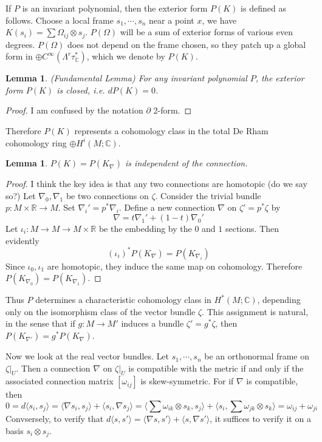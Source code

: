 \documentclass[12pt]{article}
\theoremstyle{plain}
\newtheorem{lemma}[equation]{Lemma}
\theoremstyle{definition}
\newcommand{\IC}{\mathbb{C}}
\newcommand{\IR}{\mathbb{R}}
\newcommand\tensor{{\otimes}}
\newcommand{\<}{\langle}
\renewcommand{\>}{\rangle}
\newcommand{\p}{\partial}
\newcommand{\w}{\omega}
\newcommand{\Ohm}{\Omega}
\begin{document}
If $P$ is an invariant polynomial, then the exterior form $P(K)$ is defined as follows. Choose a local frame $s_1, \cdots, s_n$ near a point $x$, we have $K(s_i) = \sum \Ohm_{ij} \tensor s_j$. $P(\Ohm)$ will be a sum of exterior forms of various even degrees. $P(\Ohm)$ does not depend on the frame chosen, so they patch up a global form in $\oplus C^\infty(\Lambda^r \tau_\IC^*)$, which we denote by $P(K)$. 

\begin{lemma}
\emph{(Fundamental Lemma)} For any invariant polynomial $P$, the exterior form $P(K)$ is closed, i.e. $d P(K) = 0$. 
\end{lemma}
\begin{proof}
I am confused by the notation $\p$ 2-form. 

\end{proof}

Therefore $P(K)$ represents a cohomology class in the total De Rham cohomology ring $\oplus H^i(M; \IC)$.
\begin{lemma} $P(K) = P(K_\nabla)$ is independent of the connection. 
\end{lemma}
\begin{proof}
I think the key idea is that any two connections are homotopic (do we say so?) Let $\nabla_0, \nabla_1$ be two connections on $\zeta$. Consider the trivial bundle $p : M \times \IR \to M$. Set $\nabla_i' = p^* \nabla_i$. Define a new connection $\nabla$ on $\zeta' = p^* \zeta$ by $$\nabla = t \nabla_1' + (1 - t) \nabla_0'$$ Let $ \iota_i : M \to M \to M \times \IR$ be the embedding by the $0$ and $1$ sections. Then evidently 
$$ (\iota_i)^* P(K_\nabla) = P(K_{\nabla_i}) $$
Since $\iota_0, \iota_1$ are homotopic, they induce the same map on cohomology. Therefore $P(K_{\nabla_0}) = P(K_{\nabla_1})$. 
\end{proof} 

Thus $P$ determines a characteristic cohomology class in $H^*(M; \IC)$, depending only on the isomorphism class of the vector bundle $\zeta$. This assignment is natural, in the sense that if $g : M \to M'$ induces a bundle $\zeta' = g^* \zeta$, then $P(K_{\nabla'}) = g^* P(K_\nabla)$. 

Now we look at the real vector bundles. Let $s_1, \cdots, s_n$ be an orthonormal frame on $\zeta|_U$. Then a connection $\nabla$ on $\zeta|_U$ is compatible with the metric if and only if the associated connection matrix $[\w_{ij}]$ is skew-symmetric. For if $\nabla$ is compatible, then $$0 = d\< s_i, s_j \> = \< \nabla s_i, s_j \> + \< s_i, \nabla s_j \> = \< \sum \w_{ik} \tensor s_k, s_j \> + \< s_i, \sum \w_{jk} \tensor s_k \> = \w_{ij} + \w_{ji}$$
Convsersely, to verify that $d \< s, s' \> = \< \nabla s, s'\> + \< s, \nabla s' \>$, it suffices to verify it on a basis $s_i \tensor s_j$. 
\end{document}
